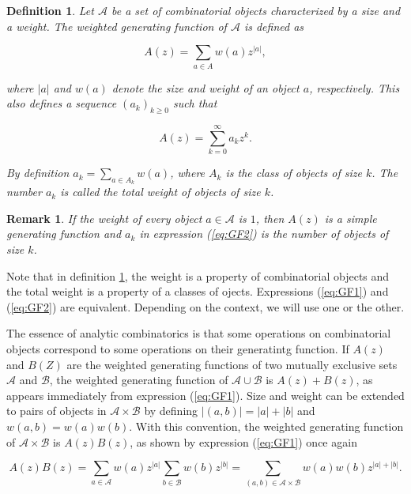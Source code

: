 \documentclass{article}
\newtheorem{definition}{Definition}
\newtheorem{remark}{Remark}
\begin{document}
\begin{definition}
\label{def:GF}
Let $\mathcal{A}$ be a set of combinatorial objects characterized by a
size and a weight. The weighted generating function of $\mathcal{A}$ is
defined as

\begin{equation}
\label{eq:GF1}
A(z) = \sum_{a \in A} w(a) z^{|a|},
\end{equation}

\noindent
where $|a|$ and $w(a)$ denote the size and weight of an object $a$,
respectively. This also defines a sequence $(a_k)_{k \geq 0}$ such that 

\begin{equation}
\label{eq:GF2}
A(z) = \sum_{k=0}^\infty a_k z^k.
\end{equation}

By definition $a_k = \sum_{a \in A_k}w(a)$, where $A_k$ is the class of
objects of size $k$. The number $a_k$ is called the total weight of
objects of size $k$.
\end{definition}

\begin{remark}
\label{rem:noweight}
If the weight of every object $a \in \mathcal{A}$ is $1$, then $A(z)$ is a
simple generating function and $a_k$ in expression (\ref{eq:GF2}) is
the number of objects of size $k$.
\end{remark}

Note that in definition \ref{def:GF}, the weight is a property of
combinatorial objects and the total weight is a property of a classes of
ojects. Expressions (\ref{eq:GF1}) and (\ref{eq:GF2}) are equivalent.
Depending on the context, we will use one or the other.

The essence of analytic combinatorics is that some operations on
combinatorial objects correspond to some operations on their generatintg
function. If $A(z)$ and $B(Z)$ are the weighted generating functions of
two mutually exclusive sets $\mathcal{A}$ and $\mathcal{B}$, the weighted
generating function of $\mathcal{A} \cup \mathcal{B}$ is $A(z) + B(z)$, as
appears immediately from expression (\ref{eq:GF1}). Size and weight can be
extended to pairs of objects in $\mathcal{A} \times \mathcal{B}$ by
defining $|(a,b)| = |a| + |b|$ and $w(a,b) = w(a)w(b)$. With this
convention, the weighted generating function of $\mathcal{A} \times
\mathcal{B}$ is $A(z)B(z)$, as shown by expression (\ref{eq:GF1})
once again

\begin{equation*}
A(z)B(z) =
\sum_{a\in \mathcal{A}}w(a)z^{|a|} \sum_{b\in \mathcal{B}}w(b)z^{|b|}
= \sum_{(a,b) \in \mathcal{A} \times \mathcal{B}} w(a)w(b)z^{|a|+|b|}.
\end{equation*}
\end{document}
